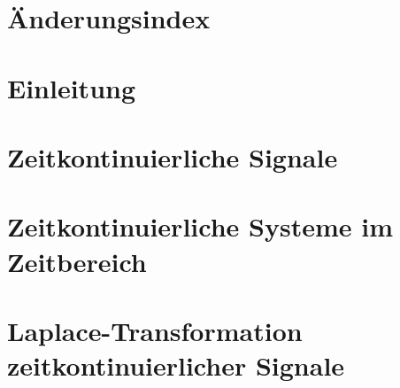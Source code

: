 

\thispagestyle{empty} %

\newpage

\thispagestyle{empty}
\section*{Änderungsindex}

\newpage
{}
\thispagestyle{empty}
\tableofcontents

\newpage

\thispagestyle{empty} %
\mbox{}


\section{Einleitung}


\clearpage

\section{Zeitkontinuierliche Signale}


\clearpage

\section{Zeitkontinuierliche Systeme im Zeitbereich}


\clearpage

\section{Laplace-Transformation zeitkontinuierlicher Signale}



